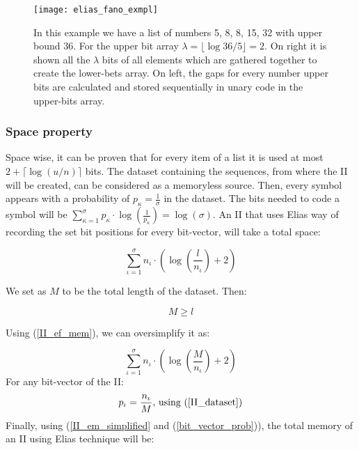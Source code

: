 \begin{figure}[h]
    \centering
    \texttt{[image: elias\_fano\_exmpl]}
    \caption{In this example we have a list of numbers 5, 8, 8, 15, 32 with upper bound 36. For the upper bit array \(\lambda = \lfloor \log36/5\rfloor = 2\). On right it is shown all the \(\lambda\) bits of all elements which are gathered together to create the lower-bets array. On left, the gaps for every number upper bits are calculated and stored sequentially in unary code in the upper-bits array.}
    \label{fig:ef_ex}
\end{figure}	
\subsubsection{Space property}
\par Space wise, it can be proven \cite{vigna_quasi-succinct_2013} that for every item of a list it is used at most \(2 + \lceil\log(u/n)\rceil\) bits. The dataset containing the sequences, from where the II will be created, can be considered as a memoryless source. Then, every symbol appears with a probability of \(p_{\kappa} = \frac{1}{\sigma} \) in the dataset. The bits needed to code a symbol will be \( \sum_{\kappa = 1}^{\sigma} p_{\kappa} \cdot \log(\frac{1}{p_{\kappa}}) = \log(\sigma)\). An II that uses Elias way of recording the set bit positions for every bit-vector, will take a total space:

\begin{equation} \label{II_ef_mem}
\sum_{\iota = 1}^{\sigma} n_{\iota}\cdot ( \log(\frac{l}{n_{\iota}}) + 2 )
\end{equation}

We set as \(M\) to be the total length of the dataset. Then:

\begin{equation} \label{II_dataset}
	M \geq l 
\end{equation} 

Using (\ref{II_ef_mem}), we can oversimplify it as:

\begin{equation}\label{II_em_simplified}
	\sum_{\iota = 1}^{\sigma} n_{\iota}\cdot ( \log(\frac{M}{n_{\iota}}) + 2 )
\end{equation}
For any bit-vector of the II:
\begin{equation} \label{bit_vector_prob}
	p_{\iota} = \frac{n_{\iota}}{M} \textnormal{, using (\ref{II_dataset})}
\end{equation}
Finally, using (\ref{II_em_simplified} and (\ref{bit_vector_prob})), the total memory of an II using Elias technique will be:


